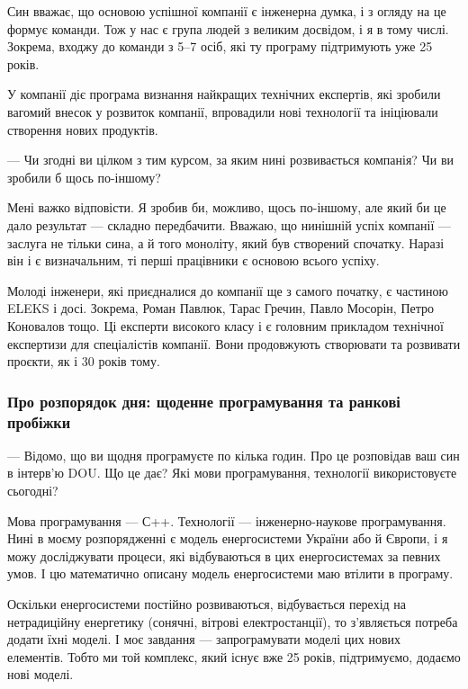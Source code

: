 Син вважає, що основою успішної компанії є інженерна думка, і з огляду на це
формує команди. Тож у нас є група людей з великим досвідом, і я в тому числі.
Зокрема, входжу до команди з 5–7 осіб, які ту програму підтримують уже 25
років.

У компанії діє програма визнання найкращих технічних експертів, які зробили
вагомий внесок у розвиток компанії, впровадили нові технології та ініціювали
створення нових продуктів.  

— Чи згодні ви цілком з тим курсом, за яким нині
розвивається компанія? Чи ви зробили б щось по-іншому?

Мені важко відповісти. Я зробив би, можливо, щось по-іншому, але який би це
дало результат — складно передбачити. Вважаю, що нинішній успіх компанії —
заслуга не тільки сина, а й того моноліту, який був створений спочатку. Наразі
він і є визначальним, ті перші працівники є основою всього успіху.

Молоді інженери, які приєдналися до компанії ще з самого початку, є частиною
ELEKS і досі. Зокрема, Роман Павлюк, Тарас Гречин, Павло Мосорін, Петро
Коновалов тощо. Ці експерти високого класу і є головним прикладом технічної
експертизи для спеціалістів компанії. Вони продовжують створювати та розвивати
проєкти, як і 30 років тому.

\subsubsection{Про розпорядок дня: щоденне програмування та ранкові пробіжки}

— Відомо, що ви щодня програмуєте по кілька годин. Про це розповідав ваш син в
інтерв’ю DOU. Що це дає? Які мови програмування, технології використовуєте
сьогодні?

Мова програмування — С++. Технології — інженерно-наукове програмування. Нині в
моєму розпорядженні є модель енергосистеми України або й Європи, і я можу
досліджувати процеси, які відбуваються в цих енергосистемах за певних умов. І
цю математично описану модель енергосистеми маю втілити в програму.

Оскільки енергосистеми постійно розвиваються, відбувається перехід на
нетрадиційну енергетику (сонячні, вітрові електростанції), то з’являється
потреба додати їхні моделі. І моє завдання — запрограмувати моделі цих нових
елементів. Тобто ми той комплекс, який існує вже 25 років, підтримуємо, додаємо
нові моделі.


